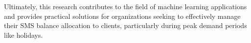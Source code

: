 \documentclass[12pt]{report} %
\begin{document}
Ultimately, this research contributes to the field of machine learning applications and provides practical solutions for organizations seeking to effectively manage their SMS balance allocation to clients, particularly during peak demand periods like holidays.

\clearpage



\end{document}

